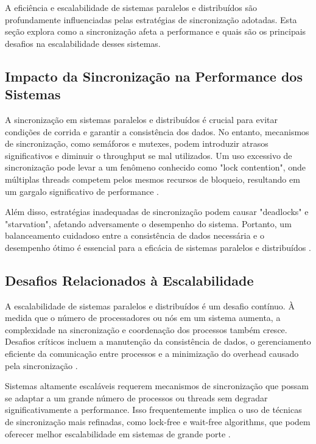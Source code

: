 \documentclass[conference]{IEEEtran}
\begin{document}
A eficiência e escalabilidade de sistemas paralelos e distribuídos 
são profundamente influenciadas pelas estratégias de sincronização adotadas. 
Esta seção explora como a sincronização afeta a performance e 
quais são os principais desafios na escalabilidade desses sistemas.

\subsection{Impacto da Sincronização na Performance dos Sistemas}
A sincronização em sistemas paralelos e distribuídos é crucial para evitar 
condições de corrida e garantir a consistência dos dados. 
No entanto, mecanismos de sincronização, como semáforos e mutexes, 
podem introduzir atrasos significativos e diminuir o throughput se mal utilizados. 
Um uso excessivo de sincronização pode levar a um fenômeno 
conhecido como "lock contention", onde múltiplas threads competem 
pelos mesmos recursos de bloqueio, 
resultando em um gargalo significativo de performance \cite{herlihy2012art}.

Além disso, estratégias inadequadas de sincronização podem causar 
"deadlocks" e "starvation", afetando adversamente o desempenho do sistema. 
Portanto, um balanceamento cuidadoso entre a consistência de dados necessária 
e o desempenho ótimo é essencial para a eficácia de 
sistemas paralelos e distribuídos \cite{andrews2000foundations}.

\subsection{Desafios Relacionados à Escalabilidade}
A escalabilidade de sistemas paralelos e distribuídos é um desafio contínuo. 
À medida que o número de processadores ou nós em um sistema aumenta, 
a complexidade na sincronização e coordenação dos processos também cresce. 
Desafios críticos incluem a manutenção da consistência de dados, 
o gerenciamento eficiente da comunicação entre processos e a 
minimização do overhead causado pela sincronização \cite{coulouris2011distributed}.

Sistemas altamente escaláveis requerem mecanismos de sincronização que 
possam se adaptar a um grande número de processos ou threads sem degradar 
significativamente a performance. 
Isso frequentemente implica o uso de técnicas de sincronização mais refinadas, 
como lock-free e wait-free algorithms, que podem oferecer melhor escalabilidade 
em sistemas de grande porte \cite{michael2004scalable}.
\end{document}
